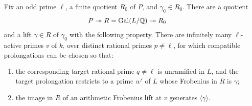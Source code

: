 \begin{proposition}\label{prop:frobenius-generation}
Fix an odd prime $\ell$, a finite quotient $R_0$ of $P$, and
$\gamma_0\in R_0$. There are a quotient
\[
 P\twoheadrightarrow R=\operatorname{Gal}(L/\mathbb Q)\twoheadrightarrow R_0
\]
and a lift $\gamma\in R$ of $\gamma_0$ with the following property.
There are infinitely many $\ell$-active primes $v$ of $k$, over
distinct rational primes $p\ne\ell$, for which compatible
prolongations can be chosen so that:
\begin{enumerate}
\item the corresponding target rational prime $q\ne\ell$ is unramified
in $L$, and the target prolongation restricts to a prime $w'$ of $L$
whose Frobenius in $R$ is $\gamma$;
\item the image in $R$ of an arithmetic Frobenius lift at $v$ generates
$\langle\gamma\rangle$.
\end{enumerate}
\end{proposition}

